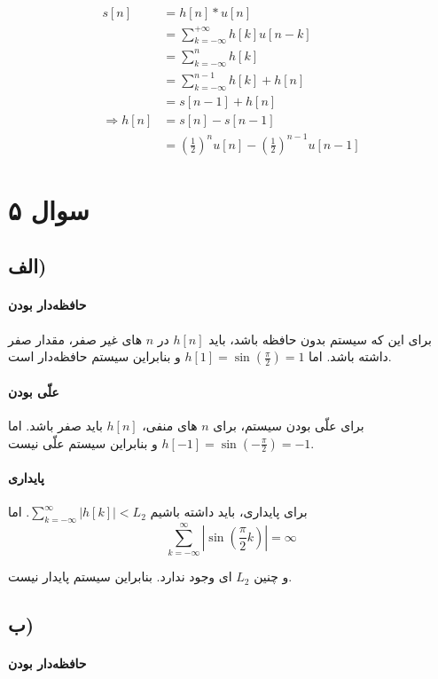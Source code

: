 \documentclass{article}
\begin{document}
	\begin{align*}
		s[n] &= h[n] * u[n] \\
		&= \sum_{k = -\infty}^{+\infty} h[k]u[n-k] \\
		&= \sum_{k = -\infty}^{n} h[k] \\
		&= \sum_{k = -\infty}^{n-1} h[k] + h[n] \\
		&= s[n-1] + h[n] \\
		\Rightarrow
		h[n] &= s[n] - s[n-1] \\
		&= \left(\frac{1}{2}\right)^n u[n] - \left(\frac{1}{2}\right)^{n-1} u[n-1]
	\end{align*}

	\section*{سوال ۵}
	\subsection*{الف)}
	\paragraph{حافظه‌دار بودن}
	برای این که سیستم بدون حافظه باشد، باید
	$h[n]$
	در
	$n$
	های غیر صفر، مقدار صفر داشته باشد. اما
	$h[1] = \sin(\frac{\pi}{2}) = 1$
	و بنابراین سیستم حافظه‌دار است.

	\paragraph{علّی بودن}
	برای علّی بودن سیستم، برای
	$n$
	های منفی،
	$h[n]$
	باید صفر باشد. اما
	$h[-1] = \sin(-\frac{\pi}{2}) = -1$
	و بنابراین سیستم علّی نیست.

	\paragraph*{پایداری}
	برای پایداری، باید داشته باشیم
	$\sum_{k=-\infty}^{\infty} |h[k]| < L_2$.
	اما
	\begin{equation*}
		\sum_{k=-\infty}^{\infty} |\sin(\frac{\pi}{2}k)| = \infty
	\end{equation*}

	و چنین
	$L_2$
	ای وجود ندارد. بنابراین سیستم پایدار نیست.

	\subsection*{ب)}
	\paragraph{حافظه‌دار بودن}
\end{document}
